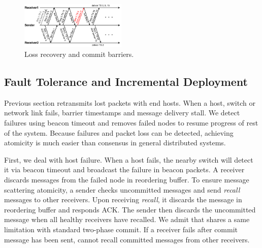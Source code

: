 \begin{figure}[t]
\centering
\includegraphics[width=0.45\textwidth]{images/loss_detection.pdf}
\caption{Loss recovery and commit barriers.}
\label{fig:ack-barrier}
\vspace{-0.4em}
\end{figure}




\subsection{Fault Tolerance and Incremental Deployment}
\label{sec:failure}

Previous section retransmits lost packets with end hosts.
When a host, switch or network link fails, barrier timestamps and message delivery stall.
We detect failures using beacon timeout and removes failed nodes to resume progress of rest of the system.
Because failures and packet loss can be detected, achieving atomicity is much easier than consensus in general distributed systems.

First, we deal with host failure.
When a host fails, the nearby switch will detect it via beacon timeout and broadcast the failure in beacon packets.
A receiver discards messages from the failed node in reordering buffer.
To ensure message scattering atomicity, a sender checks uncommitted messages and send \textit{recall} messages to other receivers.
Upon receiving \textit{recall}, it discards the message in reordering buffer and responds ACK.
The sender then discards the uncommitted message when all healthy receivers have recalled.
We admit that \sys shares a same limitation with standard two-phase commit.
If a receiver fails after commit message has been sent, \sys cannot recall committed messages from other receivers.

